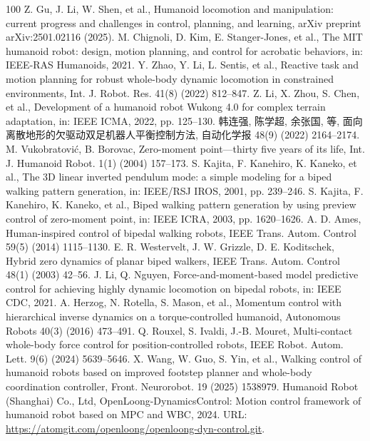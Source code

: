 ﻿\documentclass[preprint,12pt]{elsarticle}
\begin{document}
\begin{thebibliography}{100}
 Z. Gu, J. Li, W. Shen, et al., Humanoid locomotion and manipulation: current progress and challenges in control, planning, and learning, arXiv preprint arXiv:2501.02116 (2025).
 M. Chignoli, D. Kim, E. Stanger-Jones, et al., The MIT humanoid robot: design, motion planning, and control for acrobatic behaviors, in: IEEE-RAS Humanoids, 2021.
 Y. Zhao, Y. Li, L. Sentis, et al., Reactive task and motion planning for robust whole-body dynamic locomotion in constrained environments, Int. J. Robot. Res. 41(8) (2022) 812--847.
 Z. Li, X. Zhou, S. Chen, et al., Development of a humanoid robot Wukong 4.0 for complex terrain adaptation, in: IEEE ICMA, 2022, pp. 125--130.
 韩连强, 陈学超, 余张国, 等, 面向离散地形的欠驱动双足机器人平衡控制方法, 自动化学报 48(9) (2022) 2164--2174.
 M. Vukobratovi\'{c}, B. Borovac, Zero-moment point---thirty five years of its life, Int. J. Humanoid Robot. 1(1) (2004) 157--173.
 S. Kajita, F. Kanehiro, K. Kaneko, et al., The 3D linear inverted pendulum mode: a simple modeling for a biped walking pattern generation, in: IEEE/RSJ IROS, 2001, pp. 239--246.
 S. Kajita, F. Kanehiro, K. Kaneko, et al., Biped walking pattern generation by using preview control of zero-moment point, in: IEEE ICRA, 2003, pp. 1620--1626.
 A. D. Ames, Human-inspired control of bipedal walking robots, IEEE Trans. Autom. Control 59(5) (2014) 1115--1130.
 E. R. Westervelt, J. W. Grizzle, D. E. Koditschek, Hybrid zero dynamics of planar biped walkers, IEEE Trans. Autom. Control 48(1) (2003) 42--56.
 J. Li, Q. Nguyen, Force-and-moment-based model predictive control for achieving highly dynamic locomotion on bipedal robots, in: IEEE CDC, 2021.
 A. Herzog, N. Rotella, S. Mason, et al., Momentum control with hierarchical inverse dynamics on a torque-controlled humanoid, Autonomous Robots 40(3) (2016) 473--491.
 Q. Rouxel, S. Ivaldi, J.-B. Mouret, Multi-contact whole-body force control for position-controlled robots, IEEE Robot. Autom. Lett. 9(6) (2024) 5639--5646.
 X. Wang, W. Guo, S. Yin, et al., Walking control of humanoid robots based on improved footstep planner and whole-body coordination controller, Front. Neurorobot. 19 (2025) 1538979.
 Humanoid Robot (Shanghai) Co., Ltd, OpenLoong-DynamicsControl: Motion control framework of humanoid robot based on MPC and WBC, 2024. URL: \url{https://atomgit.com/openloong/openloong-dyn-control.git}.

\end{thebibliography}
\end{document}
